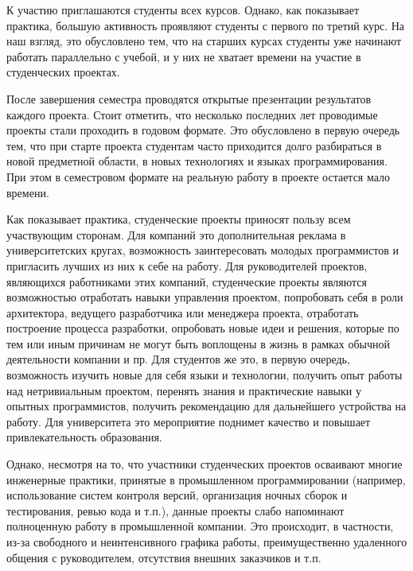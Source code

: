 \documentclass[a4paper]{article}
\begin{document}
К участию приглашаются студенты всех курсов. Однако, как показывает практика, б\textit{о}льшую активность проявляют студенты с первого по третий курс. На наш взгляд, это обусловлено тем, что на старших курсах студенты уже начинают работать параллельно с учебой, и у них не хватает времени на участие в студенческих проектах. 

После завершения семестра проводятся открытые презентации результатов каждого проекта. Стоит отметить, что несколько последних лет проводимые проекты стали проходить в годовом формате. Это обусловлено в первую очередь тем, что при старте проекта студентам часто приходится долго разбираться в новой предметной области, в новых технологиях и языках программирования. При этом в семестровом формате на реальную работу в проекте остается мало времени. 

Как показывает практика, студенческие проекты приносят пользу всем участвующим сторонам. Для компаний это дополнительная реклама в университетских кругах, возможность заинтересовать молодых программистов и пригласить лучших из них к себе на работу. Для руководителей проектов, являющихся работниками этих компаний, студенческие проекты являются возможностью отработать навыки управления проектом, попробовать себя в роли архитектора, ведущего разработчика или менеджера проекта, отработать построение процесса разработки, опробовать новые идеи и решения, которые по тем или иным причинам не могут быть воплощены в жизнь в рамках обычной деятельности компании и пр. Для студентов же это, в первую очередь, возможность изучить новые для себя языки и технологии, получить опыт работы над нетривиальным проектом, перенять знания и практические навыки у опытных программистов, получить рекомендацию для дальнейшего устройства на работу. Для университета это мероприятие поднимет качество и повышает привлекательность образования.   

Однако, несмотря на то, что участники студенческих проектов осваивают многие инженерные практики, принятые в промышленном программировании (например, использование систем контроля версий, организация ночных сборок и тестирования, ревью кода и т.п.), данные проекты слабо напоминают полноценную работу в промышленной компании. Это происходит, в частности, из-за свободного и неинтенсивного графика работы, преимущественно удаленного общения с руководителем, отсутствия внешних заказчиков и т.п.
\end{document}
